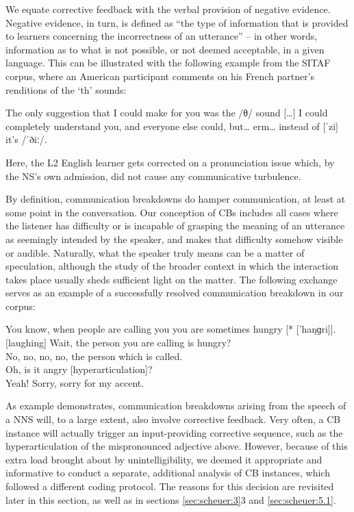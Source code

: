 \documentclass[output=paper,colorlinks,citecolor=brown,modfonts,nonflat]{../langscibook}
\begin{document}
We equate corrective feedback with the verbal provision of negative evidence. Negative evidence, in turn, is defined as “the type of information that is provided to learners concerning the incorrectness of an utterance” \citep[225]{Gass2003} – in other words, information as to what is not possible, or not deemed acceptable, in a given language. This can be illustrated with the following example from the SITAF corpus, where an American participant comments on his French partner’s renditions of the ‘th’ sounds:


\ea\label{ex:scheuer:1}
{\NS} {The} {only} {suggestion} {that} {I} {could} {make} {for} {you} {was} {the} {/θ/} {sound} {[…]} {I} {could} {completely} {understand} {you,} {and} {everyone} {else} {could,} {but…} {erm…} {instead} {of} {[ˈzi]} {it’s} {/ˈðiː/.}
\z

Here, the L2 English learner gets corrected on a pronunciation issue which, by the NS’s own admission, did not cause any communicative turbulence.

By definition, communication breakdowns do hamper communication, at least at some point in the conversation. Our conception of CBs includes all cases where the listener has difficulty or is incapable of grasping the meaning of an utterance as seemingly intended by the speaker, and makes that difficulty somehow visible or audible. Naturally, what the speaker truly means can be a matter of speculation, although the study of the broader context in which the interaction takes place usually sheds sufficient light on the matter. The following exchange serves as an example of a successfully resolved communication breakdown in our corpus:


\ea\label{ex:scheuer:2}
{\NNS} {You} {know,} {when} {people} {are} {calling} {you} {you} {are} {sometimes} {hungry} [* ['haŋɡri]].\\
{\NS} [laughing] {Wait,} {the} {person} {you} {are} {calling} {is} {hungry?}\\
{\NNS} {No,} {no,} {no,} {no,} {the} {person} {which} {is} {called.}\\
{\NS} {Oh,} {is} {it} {angry} [hyperarticulation]?\\
{\NNS} {Yeah!} {Sorry,} {sorry} {for} {my} {accent.}
\z


As example  demonstrates, communication breakdowns arising from the speech of a NNS will, to a large extent, also involve corrective feedback. Very often, a CB instance will actually trigger an input-providing corrective sequence, such as the hyperarticulation of the mispronounced adjective above. However, because of this extra load brought about by unintelligibility, we deemed it appropriate and informative to conduct a separate, additional analysis of CB instances, which followed a different coding protocol. The reasons for this decision are revisited later in this section, as well as in sections \ref{sec:scheuer:3}3 and \ref{sec:scheuer:5.1}.
\end{document}
